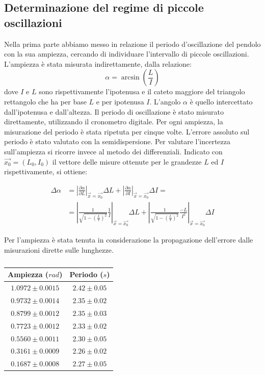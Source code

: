 \documentclass[11pt]{article}
\begin{document}
\subsection{Determinazione del regime di piccole oscillazioni }
Nella prima parte abbiamo messo in relazione il periodo d'oscillazione del pendolo con la sua ampiezza, cercando di individuare l'intervallo di piccole oscillazioni. L'ampiezza è stata misurata indirettamente, dalla relazione:
\begin{equation}
    \alpha=\arcsin(\frac{L}{I})
\end{equation}
dove $I$ e $L$ sono rispettivamente l'ipotenusa e il cateto maggiore del triangolo rettangolo che ha per base $L$ e per ipotenusa $I$. L'angolo $\alpha$ è quello intercettato dall'ipotenusa e dall'altezza. Il periodo di oscillazione è stato misurato direttamente, utilizzando il cronometro digitale. Per ogni ampiezza, la misurazione del periodo è stata ripetuta per cinque volte. L'errore assoluto sul periodo è stato valutato con la semidispersione. Per valutare l'incertezza sull'ampiezza si ricorre invece al metodo dei differenziali. Indicato con $\vec{x_0} = (L_0 , I_0)$ il vettore delle misure ottenute per le grandezze $L$ ed $I$ rispettivamente, si ottiene: 


\begin{align*}
    \Delta \alpha &= \left| \frac{\partial \alpha}{\partial L} \right|_{\vec{x} = \vec{x_0}} \Delta L + \left| \frac{\partial \alpha}{\partial I} \right|_{\vec{x} = \vec{x_0}} \Delta I = \\
    &= \left| \frac{1}{\sqrt{1 - (\frac{L}{I})^2}} \frac{1}{I}  \right|_{\vec{x} = \vec{x_0}} \Delta L + \left| \frac{1}{\sqrt{1 - (\frac{L}{I})^2}} \frac{-L}{I^2}  \right|_{\vec{x} = \vec{x_0}} \Delta I
\end{align*}

Per l'ampiezza è stata tenuta in considerazione la propagazione dell'errore dalle misurazioni dirette sulle lunghezze.

\begin{table}[H]
\centering
\begin{tabular}{|c|c|}
\hline
\textbf{Ampiezza ($rad$)} & \textbf{Periodo ($s$)} \\
\hline
$1.0972\pm 0.0015$ & $2.42\pm 0.05$ \\ 
$0.9732\pm 0.0014$ & $2.35\pm 0.02$ \\
$0.8799\pm 0.0012$ & $2.35\pm 0.03$ \\
$0.7723\pm 0.0012$ & $2.33\pm 0.02$ \\
$0.5560\pm 0.0011$ & $2.30\pm 0.05$ \\  
$0.3161\pm 0.0009$ & $2.26\pm 0.02$ \\
$0.1687\pm 0.0008$ & $2.27\pm 0.05$ \\
\hline
\end{tabular}
\caption{}
\label{tab:}
\end{table}
\end{document}
